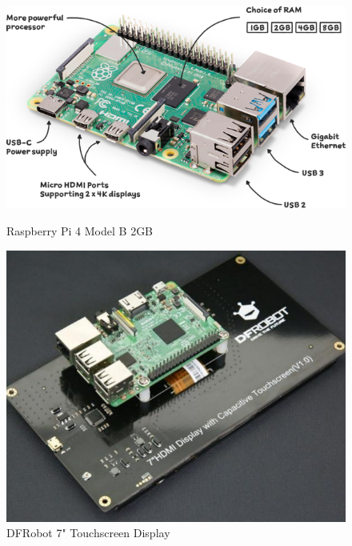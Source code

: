 \begin{figure}
  \begin{minipage}[t]{0.22\textwidth}
    \centering
    \includegraphics[width=\textwidth]{imgs/pi4_labelled.png}
    \caption{Raspberry Pi 4 Model B 2GB\cite{pi4}}
  \end{minipage}
  \hfill
  \begin{minipage}[t]{0.22\textwidth}
    \centering
    \includegraphics[width=\textwidth]{imgs/dfrobot_screen.jpg}
    \caption{DFRobot 7" Touchscreen Display\cite{7inchdisplay}}
  \end{minipage}
  \hfill
  \begin{minipage}[t]{0.22\textwidth}
      \centering

\end{minipage}
\end{figure}

